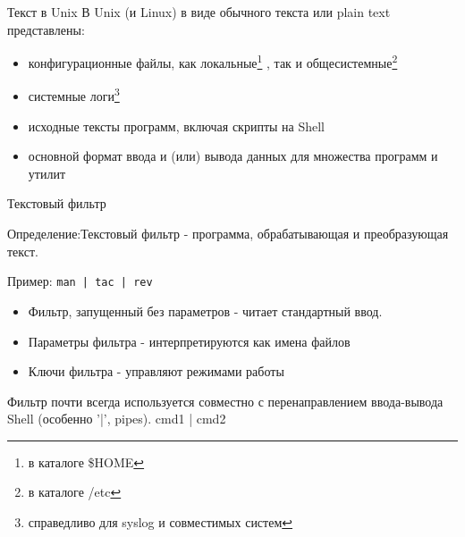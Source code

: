 \begin{frame}{Текст в Unix}
  В Unix (и Linux) в виде обычного текста или \alert{plain text} представлены:\pause
  \begin{itemize}
    \item \alert{конфигурационные файлы}, как локальные\footnote{в каталоге \$HOME} , так и общесистемные\footnote{в каталоге /etc} \pause
    \item \alert{системные логи}\footnote{справедливо для \alert{syslog} и совместимых систем}
    \item \alert{исходные тексты программ}, включая скрипты на Shell
    \item \alert{основной формат ввода и (или) вывода данных} для множества программ и утилит
  \end{itemize} 

\end{frame}



\begin{frame}{Текстовый фильтр}

  Определение:\newline \alert{Текстовый фильтр} - программа, обрабатывающая и преобразующая текст. \newline

	Пример: {\tt man | tac | rev }
  \begin{itemize}
    \item Фильтр, запущенный без параметров - читает стандартный ввод.
    \item Параметры фильтра - интерпретируются как имена файлов
    \item Ключи фильтра - управляют режимами работы
  \end{itemize} \pause

  Фильтр почти всегда используется совместно с перенаправлением ввода-вывода Shell (особенно '|', pipes). cmd1 | cmd2

\end{frame}


%

